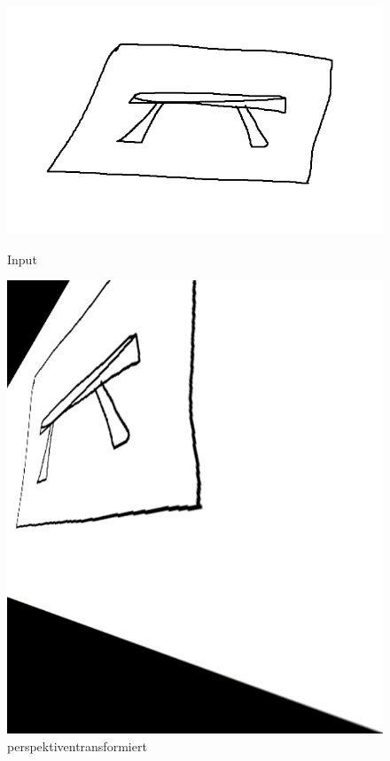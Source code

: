 \begin{figure}[H]
  \centering
  \begin{minipage}[t]{0.45\linewidth}
    \centering
    \includegraphics[width=\linewidth]{pics/bildverarbeitungsalgos/ApproxPolyDP_input.png}
    \caption{Input}
    \label{maai:wrapperspective:input}
  \end{minipage}
  \hfill
  \begin{minipage}[t]{0.45\linewidth}
    \centering
    \includegraphics[width=\linewidth]{pics/bildverarbeitungsalgos/wrapperspective.png}
    \caption{perspektiventransformiert}
    \label{maai:wrapperspective:output}
  \end{minipage}
\end{figure}

